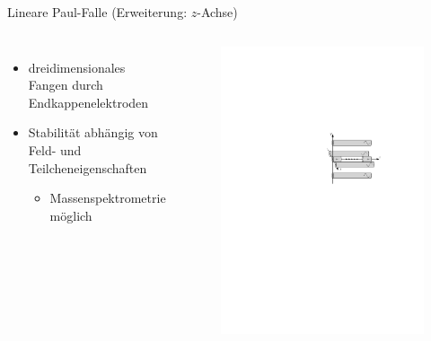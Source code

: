 \documentclass[12pt,xcolor=dvipsnames]{beamer}
\begin{document}
\begin{frame}{Lineare Paul-Falle (Erweiterung: $z$-Achse)}
	\begin{columns}[c]
		\begin{itemize}
				\setlength\itemsep{1em}
				\item dreidimensionales Fangen durch Endkappenelektroden
				
				\item Stabilität abhängig von Feld- und Teilcheneigenschaften
				\begin{itemize}
					\item Massenspektrometrie möglich
				\end{itemize}
		\end{itemize}
		
			\vspace{-0.2cm}
			\begin{figure}[h]
				\centering
				\includegraphics[width=1\textwidth]{./figures/lineare_paulfalle.pdf}
			\end{figure}
	\end{columns}
	

\end{frame}
\end{document}
